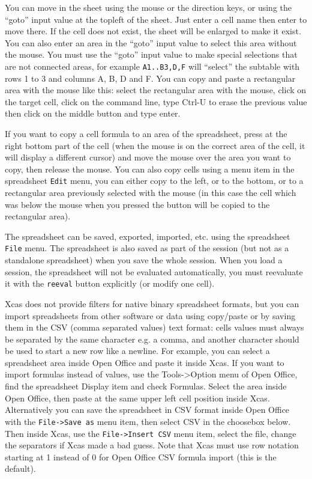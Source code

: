 \documentclass{article}
\begin{document}
You can move in the sheet using the mouse or the direction keys, or
using the ``goto'' input value at the topleft of the sheet. Just enter
a cell name then enter to move there. If the cell does not exist,
the sheet will be enlarged to make it exist. You can also enter
an area in the ``goto'' input value to select this area without the
mouse. You must use the ``goto'' input value to make special
selections that are not connected areas, for example \verb|A1..B3,D,F| will
``select'' the subtable with rows 1 to 3 and columns A, B, D and F.
You can copy and paste a rectangular area with the mouse like this:
select the rectangular area with the mouse, click on the target cell,
click on the command line, type Ctrl-U to erase the previous
value then click on the middle button and type enter.

If you want to copy a cell formula to an area of the spreadsheet,
press at the right bottom part of the cell (when the mouse is on the
correct area of the cell, it will display a different cursor)
and move the mouse over the area you want to
copy, then release the mouse.
You can also copy cells using a menu item in the spreadsheet
\verb|Edit| menu, you can either copy to the left, or to the bottom,
or to a rectangular area previously selected with the mouse (in this
case the cell which was below the mouse when you pressed the button
will be copied to the rectangular area).

The spreadsheet can be saved, exported, imported, etc. using the
spreadsheet \verb|File| menu. The spreadsheet is also saved 
as part of the session (but not as a standalone spreadsheet)
when you save the whole session. When you load a session, the
spreadsheet will not be evaluated automatically, you must reevaluate
it with the \verb|reeval| button explicitly (or modify one cell).

Xcas does not provide filters for native binary spreadsheet formats,
but you can import spreadsheets from other software or data using
copy/paste or by saving them in the CSV (comma separated values) text format:
cells values must always be separated by the same character e.g. a comma, and
another character should be used to start a new row like a newline.
For example, you can select a spreadsheet area inside Open Office
and paste it inside Xcas.
If you want to import formulas instead of values,
use the Tools->Option menu of Open Office, find the spreadsheet Display item
and check Formulas. Select the area inside Open Office, then
paste at the same upper left cell position inside Xcas.
Alternatively you can save the spreadsheet in CSV format inside
Open Office with the \verb|File->Save as| 
menu item, then select CSV in the choosebox below. 
Then inside Xcas, use the \verb|File->Insert CSV| menu item,
select the file, change the separators if Xcas made a bad guess.
Note that Xcas must use row notation starting
at 1 instead of 0 for Open Office CSV formula import (this is the default).
\end{document}
